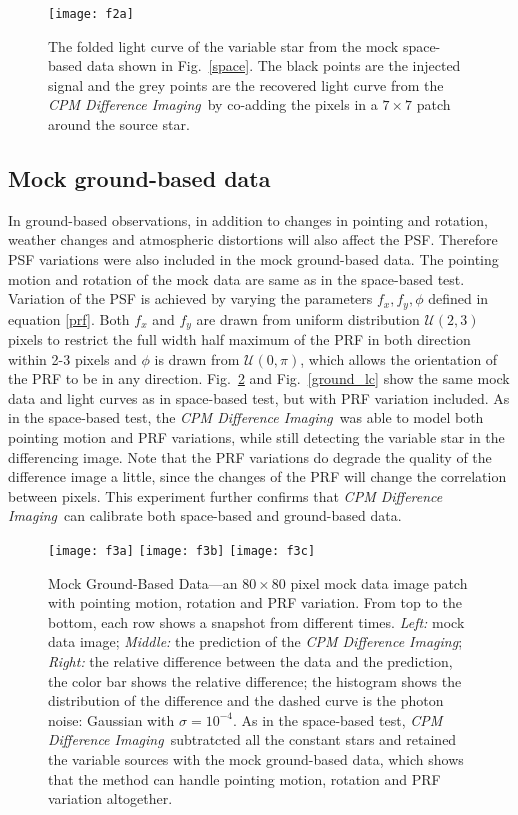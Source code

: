 \documentclass[12pt, preprint]{aastex}
\newcommand{\project}[1]{\textsl{#1}}
\newcommand{\cpmdiff}{\project{CPM Difference Imaging}}
\begin{document}
\begin{figure}[p]
\begin{center}
\texttt{[image: f2a]}
\end{center}
\caption{
\label{space_lc}
 The folded light curve of the variable star from the mock space-based data shown in Fig.~\ref{space}.
 The black points are the injected signal and the grey points are the recovered light curve from the \cpmdiff\ by co-adding the pixels in a $7\times 7$ patch around the source star.
}
\end{figure}

\subsection{Mock ground-based data}
In ground-based observations, in addition to changes in pointing and rotation, weather changes and atmospheric distortions will also affect the PSF. 
Therefore PSF variations were also included in the mock ground-based data. 
The pointing motion and rotation of the mock data are same as in the space-based test.
Variation of the PSF is achieved by varying the parameters $f_x, f_y, \phi$ defined in equation \ref{prf}.
Both $f_x$ and $f_y$ are drawn from uniform distribution ${\mathcal {U}}(2,3)$ pixels to restrict the full width half maximum of the PRF in both direction within 2-3 pixels and $\phi$ is drawn from ${\mathcal {U}}(0,\pi)$, which allows the orientation of the PRF to be in any direction.
Fig.~\ref{ground} and Fig.~\ref{ground_lc} show the same mock data and light curves as in space-based test, but with PRF variation included.  
As in the space-based test, the \cpmdiff\ was able to model both pointing motion and PRF variations, while still detecting the variable star in the differencing image.
Note that the PRF variations do degrade the quality of the difference image a little, since the changes of the PRF will change the correlation between pixels.
This experiment further confirms that \cpmdiff\ can calibrate both space-based and ground-based data.

\begin{figure}[p]
\begin{center}
\texttt{[image: f3a]}
\texttt{[image: f3b]}
\texttt{[image: f3c]}
\end{center}
\caption{
  \label{ground}
  Mock Ground-Based Data---an $80\times 80$ pixel mock data image patch with pointing motion, rotation and PRF variation. 
  From top to the bottom,  each row shows a snapshot from different times.
  \emph{Left:} mock data image;
  \emph{Middle:} the prediction of the \cpmdiff;
  \emph{Right:} the relative difference between the data and the prediction, the color bar shows the relative difference; 
  the histogram shows the distribution of the difference and the dashed curve is the photon noise: Gaussian with $\sigma = 10^{-4}$. 
  As in the space-based test, \cpmdiff\ subtratcted all the constant stars and retained the variable sources with the mock ground-based data, which shows that the method can handle pointing motion, rotation and PRF variation altogether. 
}
\end{figure}
\end{document}
